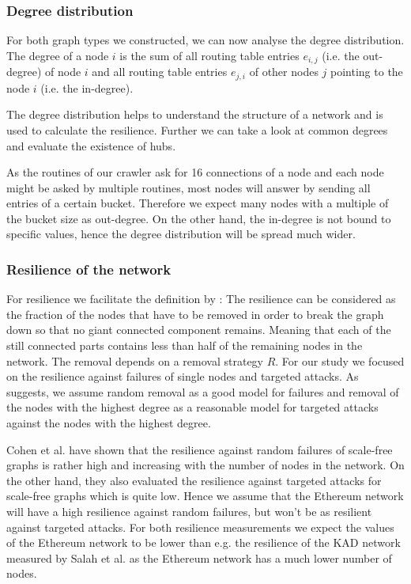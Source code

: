 \documentclass[10pt,conference,final]{IEEEtran}
\begin{document}
\vspace{1mm}

\subsubsection{Degree distribution}
\label{sec:ADegree}
For both graph types we constructed, we can now analyse the degree distribution.
The degree of a node \(i\) is the sum of all routing table entries \(e_{i,j}\) (i.e. the out-degree) of node \(i\) and all routing table entries \(e_{j,i}\) of other nodes \(j\) pointing to the node \(i\) (i.e. the in-degree).

The degree distribution helps to understand the structure of a network and is used to calculate the resilience.
Further we can take a look at common degrees and evaluate the existence of hubs.

As the routines of our crawler ask for 16 connections of a node and each node might be asked by multiple routines, most nodes will answer by sending all entries of a certain bucket.
Therefore we expect many nodes with a multiple of the bucket size as out-degree.
On the other hand, the in-degree is not bound to specific values, hence the degree distribution will be spread much wider.

\vspace{1mm}

\subsubsection{Resilience of the network}
\label{sec:AResilience}
For resilience we facilitate the definition by \cite{18}:
The resilience can be considered as the fraction of the nodes that have to be removed in order to break the graph down so that no giant connected component remains.
Meaning that each of the still connected parts contains less than half of the remaining nodes in the network.
The removal depends on a removal strategy \(R\).
For our study we focused on the resilience against failures of single nodes and targeted attacks.
As \cite{18} suggests, we assume random removal as a good model for failures and removal of the nodes with the highest degree as a reasonable model for targeted attacks against the nodes with the highest degree.

Cohen et al. \cite{39} have shown that the resilience against random failures of scale-free graphs is rather high and increasing with the number of nodes in the network.
On the other hand, they \cite{40} also evaluated the resilience against targeted attacks for scale-free graphs which is quite low.
Hence we assume that the Ethereum network will have a high resilience against random failures, but won't be as resilient against targeted attacks.
For both resilience measurements we expect the values of the Ethereum network to be lower than e.g. the resilience of the KAD network measured by Salah et al. \cite{18} as the Ethereum network has a much lower number of nodes.
\end{document}
